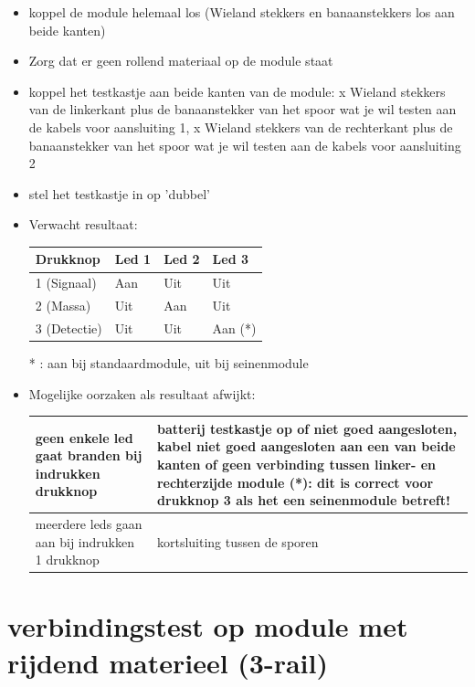 \documentclass[12pt,a4paper]{report}
\begin{document}
\begin{itemize}
\item koppel de module helemaal los (Wieland stekkers en banaanstekkers los aan beide kanten)
\item Zorg dat er geen rollend materiaal op de module staat
\item koppel het testkastje aan beide kanten van de module:
 x Wieland stekkers van de linkerkant plus de banaanstekker van het spoor wat je wil testen aan de kabels voor aansluiting 1,
 x Wieland stekkers van de rechterkant plus de banaanstekker van het spoor wat je wil testen aan de kabels voor aansluiting 2

\item stel het testkastje in op 'dubbel' 
\item Verwacht resultaat:\\

\begin{tabular}{|l|l|l|l|}
\hline
Drukknop&Led 1&Led 2&Led 3\\
\hline
1 (Signaal)&Aan&Uit&Uit\\
\hline
2 (Massa)&Uit&Aan&Uit\\
\hline
3 (Detectie)&Uit&Uit&Aan (*)\\
\hline
\end{tabular}

	* : aan bij standaardmodule, uit bij seinenmodule
\item Mogelijke oorzaken als resultaat afwijkt:\\
\begin{tabular}{|p{8cm}|p{6cm}|}
\hline
geen enkele led gaat branden bij indrukken drukknop&batterij testkastje op of niet goed aangesloten, kabel niet goed aangesloten aan een van beide kanten of geen verbinding tussen linker- en rechterzijde module (*): dit is correct voor drukknop 3 als het een seinenmodule betreft!\\
\hline
meerdere leds gaan aan bij indrukken 1 drukknop&kortsluiting tussen de sporen\\
\hline
\end{tabular}

\end{itemize}

\section{verbindingstest op module met rijdend materieel (3-rail)}
\end{document}
